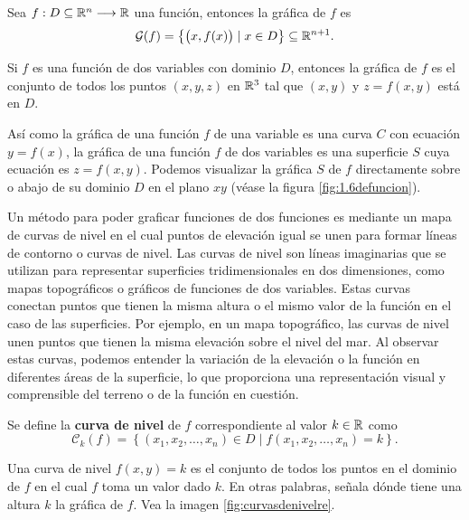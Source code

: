 \vspace{-0.5cm}
\begin{definition}
    Sea $f:D \subseteq \RR[n] \longrightarrow \RR$ una función, entonces la gráfica de $f$ es
    $$\mathcal{G}(f) = \left\{ \big(x, f(x)\big) \mid x \in D \right\} \subseteq \RR[n+1].$$
\end{definition}

\begin{observation}
    Si $f$ es una función de dos variables con dominio $D$, entonces la gráfica de $f$ es el conjunto de todos los puntos $(x, y, z)$ en $\RR[3]$ tal que $(x, y)$ y $z = f(x, y)$ está en $D$.
\end{observation}

Así como la gráfica de una función $f$ de una variable es una curva $C$ con ecuación $y = f (x)$, la gráfica de una función $f$ de dos variables es una superficie $S$ cuya ecuación es $z = f (x, y)$. Podemos visualizar la gráfica $S$ de $f$ directamente sobre o abajo de su dominio $D$ en el plano $xy$ (véase la figura \ref{fig:1.6defuncion}).

Un método para poder graficar funciones de dos funciones es mediante un mapa de curvas de nivel en el cual puntos de elevación igual se unen para formar líneas de contorno o curvas de nivel. Las curvas de nivel son líneas imaginarias que se utilizan para representar superficies tridimensionales en dos dimensiones, como mapas topográficos o gráficos de funciones de dos variables. Estas curvas conectan puntos que tienen la misma altura o el mismo valor de la función en el caso de las superficies. Por ejemplo, en un mapa topográfico, las curvas de nivel unen puntos que tienen la misma elevación sobre el nivel del mar. Al observar estas curvas, podemos entender la variación de la elevación o la función en diferentes áreas de la superficie, lo que proporciona una representación visual y comprensible del terreno o de la función en cuestión. %

\begin{definition}
    Se define la \textbf{curva de nivel} de $f$ correspondiente al valor $k \in \RR$ como
    $$\mathcal{C}_k(f) = \left\{ (x_1, x_2, \dots, x_n) \in D \mid f(x_1, x_2, \dots, x_n) = k \right\}.$$
\end{definition}

\begin{observation}
    Una curva de nivel $f(x, y) = k$ es el conjunto de todos los puntos en el dominio de $f$ en el cual $f$ toma un valor dado $k$. En otras palabras, señala dónde tiene una altura $k$ la gráfica de $f$. Vea la imagen \ref{fig:curvasdenivelre}.
\end{observation}

